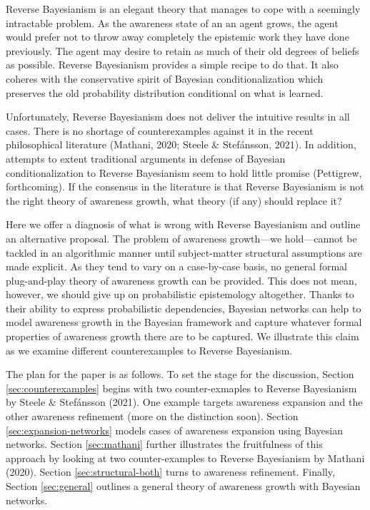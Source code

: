 \documentclass[
  11pt,
  dvipsnames,enabledeprecatedfontcommands, todos]{scrartcl}
\begin{document}
Reverse Bayesianism is an elegant theory that manages to cope with a
seemingly intractable problem. As the awareness state of an an agent
grows, the agent would prefer not to throw away completely the epistemic
work they have done previously. The agent may desire to retain as much
of their old degrees of beliefs as possible. Reverse Bayesianism
provides a simple recipe to do that. It also coheres with the
conservative spirit of Bayesian conditionalization which preserves the
old probability distribution conditional on what is learned.

Unfortunately, Reverse Bayesianism does not deliver the intuitive
results in all cases. There is no shortage of counterexamples against it
in the recent philosophical literature (Mathani, 2020; Steele \&
Stefánsson, 2021). In addition, attempts to extent traditional arguments
in defense of Bayesian conditionalization to Reverse Bayesianism seem to
hold little promise (Pettigrew, forthcoming). If the consensus in the
literature is that Reverse Bayesianism is not the right theory of
awareness growth, what theory (if any) should replace it?

Here we offer a diagnosis of what is wrong with Reverse Bayesianism and
outline an alternative proposal. The problem of awareness growth---we
hold---cannot be tackled in an algorithmic manner until subject-matter
structural assumptions are made explicit. As they tend to vary on a
case-by-case basis, no general formal plug-and-play theory of awareness
growth can be provided. This does not mean, however, we should give up
on probabilistic epistemology altogether. Thanks to their ability to
express probabilistic dependencies, Bayesian networks can help to model
awareness growth in the Bayesian framework and capture whatever formal
properties of awareness growth there are to be captured. We illustrate
this claim as we examine different counterexamples to Reverse
Bayesianism.

The plan for the paper is as follows. To set the stage for the
discussion, Section \ref{sec:counterexamples} begins with two
counter-exmaples to Reverse Bayesianism by Steele \& Stefánsson (2021).
One example targets awareness expansion and the other awareness
refinement (more on the distinction soon). Section
\ref{sec:expansion-networks} models cases of awareness expansion using
Bayesian networks. Section \ref{sec:mathani} further illustrates the
fruitfulness of this approach by looking at two counter-examples to
Reverse Bayesianism by Mathani (2020). Section \ref{sec:structural-both}
turns to awareness refinement. Finally, Section \ref{sec:general}
outlines a general theory of awareness growth with Bayesian networks.
\end{document}
